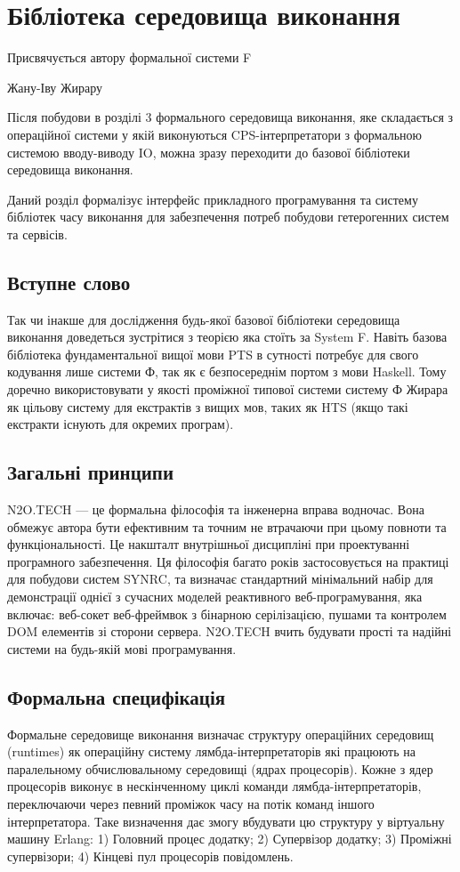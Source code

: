 \chapter{Бібліотека середовища виконання}
\epigraph{Присвячується автору формальної системи F}{Жану-Іву Жирару}

Після побудови в розділі 3 формального середовища виконання,
яке складається з операційної системи у якій виконуються
CPS-інтерпретатори з формальною системою вводу-виводу IO, можна зразу
переходити до базової бібліотеки середовища виконання.

Даний розділ формалізує інтерфейс прикладного програмування та систему
бібліотек часу виконання для забезпечення потреб побудови гетерогенних систем та сервісів.

\section*{Вступне слово}
Так чи інакше для дослідження будь-якої базової бібліотеки середовища
виконання доведеться зустрітися з теорією яка стоїть за System F.
Навіть базова бібліотека фундаментальної вищої мови PTS в сутності
потребує для свого кодування лише системи Ф, так як є безпосереднім
портом з мови Haskell. Тому доречно використовувати у якості проміжної
типової системи систему Ф Жирара як цільову систему для
екстрактів з вищих мов, таких як HTS (якщо такі екстракти існують для окремих програм).

\section{Загальні принципи}
N2O.TECH — це формальна філософія та інженерна вправа водночас.
Вона обмежує автора бути ефективним та точним не втрачаючи
при цьому повноти та функціональності. Це накшталт внутрішньої
дисципліні при проектуванні програмного забезпечення. Ця філософія
багато років застосовується на практиці для побудови систем SYNRC,
та визначає стандартний мінімальний набір для демонстрації однієї
з сучасних моделей реактивного веб-програмування, яка включає: веб-сокет
веб-фреймвок з бінарною серілізацією, пушами та контролем DOM елементів
зі сторони сервера. N2O.TECH вчить будувати прості та надійні системи
на будь-якій мові програмування.

\section{Формальна специфікація}
Формальне середовище виконання визначає структуру операційних середовищ (runtimes) як
операційну систему лямбда-інтерпретаторів які працюють на паралельному
обчислювальному середовищі (ядрах процесорів). Кожне з ядер процесорів
виконує в нескінченному циклі команди лямбда-інтерпретаторів, переключаючи
через певний проміжок часу на потік команд іншого інтерпретатора. Таке
визначення дає змогу вбудувати цю структуру у віртуальну машину Erlang:
1) Головний процес додатку; 2) Супервізор додатку; 3) Проміжні
супервізори; 4) Кінцеві пул процесорів повідомлень.

